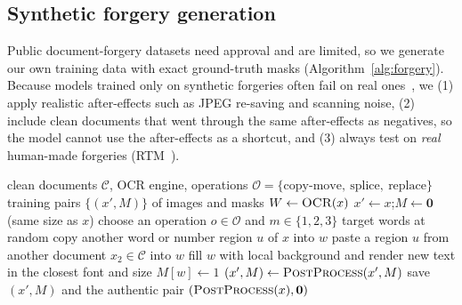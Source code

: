 \documentclass[11pt,a4paper]{article}
\begin{document}
\subsection{Synthetic forgery generation}
Public document-forgery datasets need approval and are limited, so we generate our own training
data with exact ground-truth masks (Algorithm~\ref{alg:forgery}). Because models trained only on
synthetic forgeries often fail on real ones~\cite{rtm,dhouib2026}, we (1) apply realistic
after-effects such as JPEG re-saving and scanning noise, (2) include clean documents that went
through the same after-effects as negatives, so the model cannot use the after-effects as a
shortcut, and (3) always test on \emph{real} human-made forgeries (RTM~\cite{rtm}).

\begin{algorithm}[htbp]
\caption{Synthetic document forgery generation}
\label{alg:forgery}
\begin{algorithmic}[1]
\Require clean documents $\mathcal{C}$, OCR engine, operations $\mathcal{O}=\{\text{copy-move},\ \text{splice},\ \text{replace}\}$
\Ensure training pairs $\{(x',M)\}$ of images and masks
  \State $W\gets\textsc{OCR}(x)$ 
  \State $x'\gets x$;\quad $M\gets\mathbf{0}$ (same size as $x$)
  \State choose an operation $o\in\mathcal{O}$ and $m\in\{1,2,3\}$ target words at random
      \State copy another word or number region $u$ of $x$ into $w$
      \State paste a region $u$ from another document $x_2\in\mathcal{C}$ into $w$
    \Else
      \State fill $w$ with local background and render new text in the closest font and size
    \EndIf
    \State $M[w]\gets1$
  \EndFor
  \State $(x',M)\gets\textsc{PostProcess}(x',M)$ 
  \State save $(x',M)$ and the authentic pair $(\textsc{PostProcess}(x),\mathbf{0})$
\EndFor
\end{algorithmic}
\end{algorithm}
\end{document}

